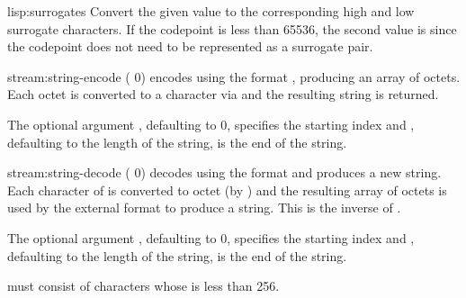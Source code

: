 \begin{defun}{lisp:}{surrogates}{\args {}}
  Convert the given  value to the corresponding high
  and low surrogate characters.  If the codepoint is less than 65536,
  the second value is \nil{} since the codepoint does not need to be
  represented as a surrogate pair.
\end{defun}

\begin{defun}{stream:}{string-encode}{\args {}
     \ampoptional{} ( 0) }
   encodes  using the format
  , producing an array of octets.  Each octet is
  converted to a character via  and the resulting
  string is returned.

  The optional argument , defaulting to 0, specifies the
  starting index and , defaulting to the length of the
  string, is the end of the string.
\end{defun}

\begin{defun}{stream:}{string-decode}{\args {}
     \ampoptional{} ( 0) }
   decodes  using the format
   and produces a new string.  Each character of
   is converted to octet (by ) and the
  resulting array of octets is used by the external format to produce
  a string.  This is the inverse of .

  The optional argument , defaulting to 0, specifies the
  starting index and , defaulting to the length of the
  string, is the end of the string.

   must consist of characters whose  is
  less than 256.
\end{defun}

